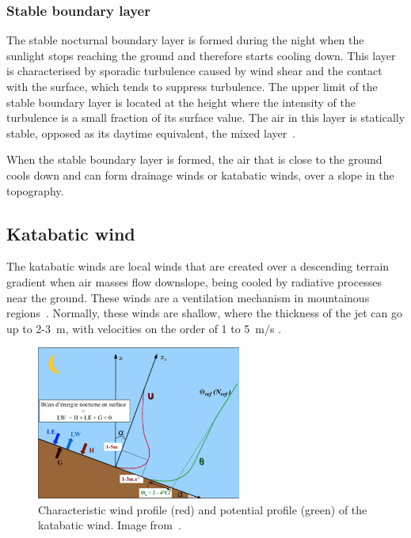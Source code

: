 \subsubsection{Stable boundary layer}
The stable nocturnal boundary layer is formed during the night when the sunlight stops reaching the ground and therefore starts cooling down. This layer is characterised by sporadic turbulence caused by wind shear and the contact with the surface, which tends to suppress turbulence. The upper limit of the stable boundary layer is located at the height where the intensity of the turbulence is a small fraction of its surface value. The air in this layer is statically stable, opposed as its daytime equivalent, the mixed layer~\citep{stull2012introduction}.

When the stable boundary layer is formed, the air that is close to the ground cools down and can form drainage winds or katabatic winds, over a slope in the topography.

\subsection{Katabatic wind} \label{sec:katabatic_winds}

The katabatic winds are local winds that are created over a descending terrain gradient when air masses flow downslope, being cooled by radiative processes near the ground. These winds are a ventilation mechanism in mountainous regions~\citep{manins1979model}. Normally, these winds are shallow, where the thickness of the jet can go up to 2-3~m, with velocities on the order of 1 to 5~m/s \citep{stull2012introduction}. 

\begin{figure}[ht!]
	\vspace{-5pt}
    \centering
\includegraphics[width=0.6\textwidth]{fig/profiles_katabatic_wind.png}
    \caption{Characteristic wind profile (red) and potential profile (green) of the katabatic wind. Image from~\cite{claudine}.}
    \label{fig:u_profile}
  \vspace{-5pt}
\end{figure}

